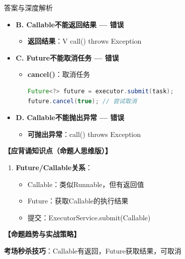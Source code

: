 \documentclass[12pt, a4paper]{ctexart}
\begin{document}
\begin{enumerate}[label=\textbf{\arabic*.}]
\begin{bluebox}{答案与深度解析}
\begin{itemize}[label={}, leftmargin=*, nosep]
		      \item \textbf{B. Callable不能返回结果 — 错误}
		      \begin{itemize}[label={}, leftmargin=*, nosep]
			      \item \textbf{返回结果}：V call() throws Exception
		      \end{itemize}

		      \item \textbf{C. Future不能取消任务 — 错误}
		      \begin{itemize}[label={}, leftmargin=*, nosep]
			      \item \textbf{cancel()}：取消任务
			            \begin{lstlisting}[language=Java]
Future<?> future = executor.submit(task);
future.cancel(true); // 尝试取消
      \end{lstlisting}
		      \end{itemize}

		      \item \textbf{D. Callable不能抛出异常 — 错误}
		      \begin{itemize}[label={}, leftmargin=*, nosep]
			      \item \textbf{可抛出异常}：call() throws Exception
		      \end{itemize}

		      \end{itemize}

		      \textbf{【应背诵知识点（命题人思维版）】}
		      \begin{enumerate}[label={}, leftmargin=*, nosep]
			      \item \textbf{Future/Callable关系}：
			            \begin{itemize}[label={}, nosep]
				            \item Callable：类似Runnable，但有返回值
				            \item Future：获取Callable的执行结果
				            \item 提交：ExecutorService.submit(Callable)
			            \end{itemize}
		      \end{enumerate}

		      \textbf{【命题趋势与实战策略】}

		      \textbf{考场秒杀技巧}：Callable有返回，Future获取结果，可取消
	      \end{bluebox}


\end{enumerate}
\end{document}
